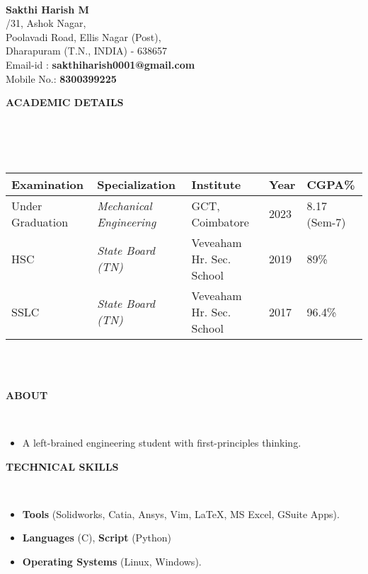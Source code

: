 \documentclass[a4paper,10pt]{article}
\newcommand{\lsep}{-0.5cm}
\newcommand{\resheading}[1]{{\small \colorbox{mygrey}{\begin{minipage}{0.975\textwidth}{\textbf{#1 \vphantom{p\^{E}}}}\end{minipage}}}}
\begin{document}
\hspace{0.5cm}\\[-0.2cm]

\textbf{Sakthi Harish M} \\
/31, Ashok Nagar, \\
\indent Poolavadi Road, Ellis Nagar (Post), \\
\indent Dharapuram (T.N., INDIA) - 638657\\
\indent Email-id : \textbf{sakthiharish0001@gmail.com} \\
\indent Mobile No.: \textbf{8300399225} \\

\resheading{\textbf{ACADEMIC DETAILS} }\\[\lsep]
\\ \\
\indent \begin{tabular}{ l @{\hskip 0.15in} l @{\hskip 0.15in} l @{\hskip 0.15in} l @{\hskip 0.15in} l }
\hline
\textbf{Examination} & \textbf{Specialization} & \textbf{Institute} & \textbf{Year} & \textbf{CGPA\%} \\
\hline
Under Graduation & \textit{Mechanical Engineering} & GCT, Coimbatore & 2023 & 8.17 (Sem-7)\\
HSC & \textit{State Board (TN)} & Veveaham Hr. Sec. School & 2019 & 89\% \\
SSLC & \textit{State Board (TN)} & Veveaham Hr. Sec. School & 2017 & 96.4\% \\
\hline
\end{tabular}
\\ \\

\resheading{\textbf{ABOUT} }\\[\lsep]
\begin{itemize}
\item \noindent A left-brained engineering student with first-principles thinking.
\end{itemize}

\resheading{\textbf{TECHNICAL SKILLS} }\\[\lsep]
\begin{itemize}
\item \noindent \textbf{Tools} (Solidworks, Catia, Ansys, Vim, \LaTeX, MS Excel, GSuite Apps).
\item \noindent \textbf{Languages} (C), \textbf{Script} (Python)
\item \noindent \textbf{Operating Systems} (Linux, Windows).
\end{itemize}
\end{document}

